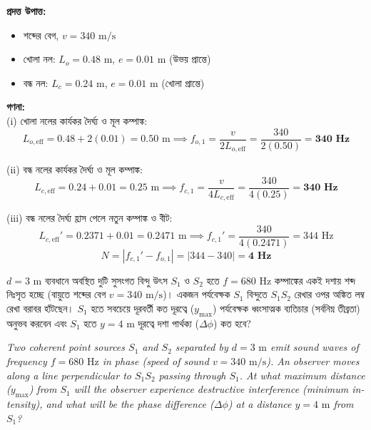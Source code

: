 \documentclass[12pt, a4paper]{article}
\begin{document}
\begin{tcolorbox}[solutionbox={সমাধান (Solution)}]
    \noindent
    \textbf{প্রদত্ত উপাত্ত:}
    \begin{itemize}[leftmargin=1.5em, itemsep=0.2em]
        \item শব্দের বেগ, $v = 340\text{ m/s}$
        \item খোলা নল: $L_o = 0.48\text{ m}$, $e = 0.01\text{ m}$ (উভয় প্রান্তে)
        \item বন্ধ নল: $L_c = 0.24\text{ m}$, $e = 0.01\text{ m}$ (খোলা প্রান্তে)
    \end{itemize}

    \vspace{0.6em}
    \noindent\textbf{গণনা:} \\
    (i) খোলা নলের কার্যকর দৈর্ঘ্য ও মূল কম্পাঙ্ক:
    \[ L_{o,\text{eff}} = 0.48 + 2(0.01) = 0.50\text{ m} \implies f_{o,1} = \frac{v}{2 L_{o,\text{eff}}} = \frac{340}{2(0.50)} = \mathbf{340\text{ Hz}} \]
    
    (ii) বন্ধ নলের কার্যকর দৈর্ঘ্য ও মূল কম্পাঙ্ক:
    \[ L_{c,\text{eff}} = 0.24 + 0.01 = 0.25\text{ m} \implies f_{c,1} = \frac{v}{4 L_{c,\text{eff}}} = \frac{340}{4(0.25)} = \mathbf{340\text{ Hz}} \]
    
    (iii) বন্ধ নলের দৈর্ঘ্য হ্রাস পেলে নতুন কম্পাঙ্ক ও বীট:
    \[ L_{c,\text{eff}}' = 0.2371 + 0.01 = 0.2471\text{ m} \implies f_{c,1}' = \frac{340}{4(0.2471)} = 344\text{ Hz} \]
    \[ N = |f_{c,1}' - f_{o,1}| = |344 - 340| = \mathbf{4\text{ Hz}} \]
\end{tcolorbox}


\begin{tcolorbox}[questionbox={প্রশ্ন (Question) 24}]
    \noindent
    $d = 3\text{ m}$ ব্যবধানে অবস্থিত দুটি সুসংগত বিন্দু উৎস $S_1$ ও $S_2$ হতে $f = 680\text{ Hz}$ কম্পাঙ্কের একই দশায় শব্দ নিঃসৃত হচ্ছে (বায়ুতে শব্দের বেগ $v = 340\text{ m/s}$)। একজন পর্যবেক্ষক $S_1$ বিন্দুতে $S_1 S_2$ রেখার ওপর অঙ্কিত লম্ব রেখা বরাবর হাঁটছেন। $S_1$ হতে সবচেয়ে দূরবর্তী কত দূরত্বে ($y_{\text{max}}$) পর্যবেক্ষক ধ্বংসাত্মক ব্যতিচার (সর্বনিম্ন তীব্রতা) অনুভব করবেন এবং $S_1$ হতে $y = 4\text{ m}$ দূরত্বে দশা পার্থক্য ($\Delta \phi$) কত হবে?
    
    \vspace{0.8em}
    \begin{english}
    \noindent\textit{\color{darkgray}
    Two coherent point sources $S_1$ and $S_2$ separated by $d = 3\text{ m}$ emit sound waves of frequency $f = 680\text{ Hz}$ in phase (speed of sound $v = 340\text{ m/s}$). An observer moves along a line perpendicular to $S_1 S_2$ passing through $S_1$. At what maximum distance ($y_{\text{max}}$) from $S_1$ will the observer experience destructive interference (minimum intensity), and what will be the phase difference ($\Delta \phi$) at a distance $y = 4\text{ m}$ from $S_1$?
    }
    \end{english}
\end{tcolorbox}
\end{document}
